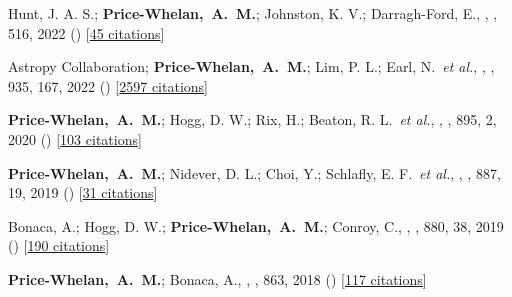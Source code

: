 \item[{\color{deemph}\scriptsize11}]Hunt, J. A. S.; \textbf{Price-Whelan,~A.~M.}; Johnston, K. V.; Darragh-Ford, E., , \mnras, 516, 2022 () [\href{http://adsabs.harvard.edu/abs/2022MNRAS.516L...7H}{45 citations}]

\item[{\color{deemph}\scriptsize10}]Astropy Collaboration; \textbf{Price-Whelan,~A.~M.}; Lim, P. L.; Earl, N.~\textit{et al.}, , \apj, 935, 167, 2022 () [\href{http://adsabs.harvard.edu/abs/2022ApJ...935..167A}{2597 citations}]

\item[{\color{deemph}\scriptsize9}]\textbf{Price-Whelan,~A.~M.}; Hogg, D. W.; Rix, H.; Beaton, R. L.~\textit{et al.}, , \apj, 895, 2, 2020 () [\href{http://adsabs.harvard.edu/abs/2020ApJ...895....2P}{103 citations}]

\item[{\color{deemph}\scriptsize8}]\textbf{Price-Whelan,~A.~M.}; Nidever, D. L.; Choi, Y.; Schlafly, E. F.~\textit{et al.}, , \apj, 887, 19, 2019 () [\href{http://adsabs.harvard.edu/abs/2019ApJ...887...19P}{31 citations}]

\item[{\color{deemph}\scriptsize7}]Bonaca, A.; Hogg, D. W.; \textbf{Price-Whelan,~A.~M.}; Conroy, C., , \apj, 880, 38, 2019 () [\href{http://adsabs.harvard.edu/abs/2019ApJ...880...38B}{190 citations}]

\item[{\color{deemph}\scriptsize6}]\textbf{Price-Whelan,~A.~M.}; Bonaca, A., , \apj, 863, 2018 () [\href{http://adsabs.harvard.edu/abs/2018ApJ...863L..20P}{117 citations}]

